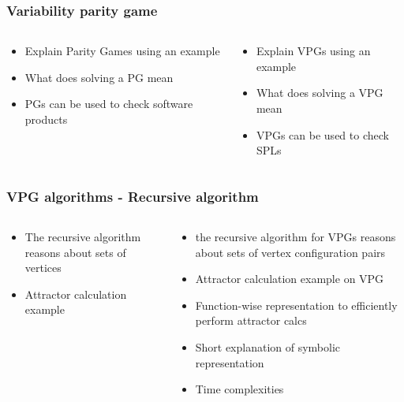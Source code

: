 \documentclass[handout,aspectratio=169]{beamer}
\begin{document}

\begin{frame}[t]
\frametitle{Variability parity game}
\begin{columns}[t]
	\begin{column}{0.5\textwidth}
		\begin{itemize}
			\item Explain Parity Games using an example
			\item What does solving a PG mean
			\item PGs can be used to check software products
		\end{itemize}
	\end{column}
	\begin{column}{0.5\textwidth}
		\begin{itemize}
			\item Explain VPGs using an example
			\item What does solving a VPG mean
			\item VPGs can be used to check SPLs
		\end{itemize}
	\end{column}
\end{columns}
\end{frame}

\begin{frame}[t]
\frametitle{VPG algorithms - Recursive algorithm}
\begin{columns}[t]
	\begin{column}{0.5\textwidth}
		\begin{itemize}
			\item The recursive algorithm reasons about sets of vertices
			\item Attractor calculation example
		\end{itemize}
	\end{column}
	\begin{column}{0.5\textwidth}
		\begin{itemize}
			\item the recursive algorithm for VPGs reasons about sets of vertex configuration pairs
			\item Attractor calculation example on VPG
			\item Function-wise representation to efficiently perform attractor calcs
			\item Short explanation of symbolic representation
			\item Time complexities
		\end{itemize}
	\end{column}
\end{columns}
\end{frame}
\end{document}
